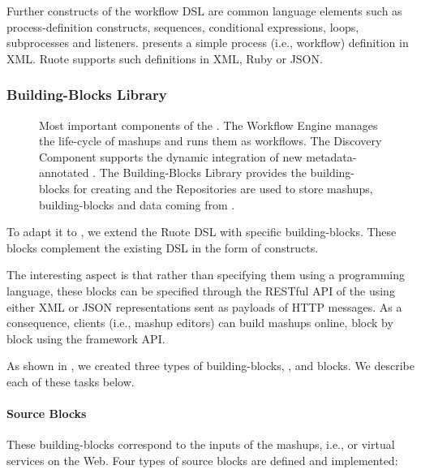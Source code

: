 Further constructs of the workflow DSL are common language elements such as process-definition constructs, sequences, conditional expressions, loops, subprocesses and listeners.  presents a simple process (i.e., workflow) definition in XML. Ruote supports such definitions in XML, Ruby or JSON.



\subsubsection{\pMashups{} Building-Blocks Library}\label{blocks}
\begin{figure}
\caption{Most important components of the \pMashupsFw{}. The Workflow Engine manages the life-cycle of mashups and runs them as workflows. The Discovery Component supports the dynamic integration of new metadata-annotated \sts{}. The Building-Blocks Library provides the building-blocks for creating \pMashups{} and the Repositories are used to store mashups, building-blocks and data coming from \sts{}.}
\label{fig:mashupFworkCompo}
\end{figure}
To adapt it to \pMashups{}, we extend the Ruote DSL with \WoT{} specific building-blocks. These blocks complement the existing DSL in the form of  constructs. 

The interesting aspect is that rather than specifying them using a programming language, these blocks can be specified through the RESTful API of the \pMashupsFw{} using either XML or JSON representations sent as payloads of HTTP messages. As a consequence, clients (i.e., mashup editors) can build mashups online, block by block using the framework API.

As shown in , we created three types of building-blocks, ,  and  blocks. We describe each of these tasks below.

\paragraph{Source Blocks}
These building-blocks correspond to the inputs of the mashups, i.e., \sts{} or virtual services on the Web. Four types of source blocks are defined and implemented:

